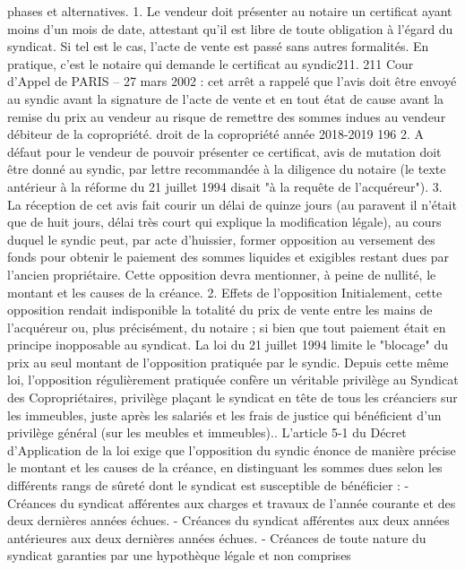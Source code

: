 	phases et alternatives.
	1. Le vendeur doit présenter au notaire un certificat ayant moins d'un mois de date, attestant
	qu'il est libre de toute obligation à l'égard du syndicat. Si tel est le cas, l'acte de vente est
	passé sans autres formalités. En pratique, c'est le notaire qui demande le certificat au
	syndic211.
	211 Cour d’Appel de PARIS – 27 mars 2002 : cet arrêt a rappelé que l’avis doit être envoyé au syndic avant la signature
	de l’acte de vente et en tout état de cause avant la remise du prix au vendeur au risque de remettre des sommes indues
	au vendeur débiteur de la copropriété.
	droit de la copropriété année 2018-2019
	196
	2. A défaut pour le vendeur de pouvoir présenter ce certificat, avis de mutation doit être
	donné au syndic, par lettre recommandée à la diligence du notaire (le texte antérieur à la
	réforme du 21 juillet 1994 disait "à la requête de l'acquéreur").
	3. La réception de cet avis fait courir un délai de quinze jours (au paravent il n'était que de
	huit jours, délai très court qui explique la modification légale), au cours duquel le syndic
	peut, par acte d'huissier, former opposition au versement des fonds pour obtenir le
	paiement des sommes liquides et exigibles restant dues par l'ancien propriétaire. Cette
	opposition devra mentionner, à peine de nullité, le montant et les causes de la créance.
	2. Effets de l’opposition
	Initialement, cette opposition rendait indisponible la totalité du prix de vente entre les mains de
	l'acquéreur ou, plus précisément, du notaire ; si bien que tout paiement était en principe inopposable au
	syndicat. La loi du 21 juillet 1994 limite le "blocage" du prix au seul montant de l'opposition pratiquée par
	le syndic.
	Depuis cette même loi, l'opposition régulièrement pratiquée confère un véritable privilège au Syndicat des
	Copropriétaires, privilège plaçant le syndicat en tête de tous les créanciers sur les immeubles, juste après
	les salariés et les frais de justice qui bénéficient d'un privilège général (sur les meubles et immeubles)..
	L'article 5-1 du Décret d'Application de la loi exige que l'opposition du syndic énonce de manière précise
	le montant et les causes de la créance, en distinguant les sommes dues selon les différents rangs de sûreté
	dont le syndicat est susceptible de bénéficier :
	- Créances du syndicat afférentes aux charges et travaux de l'année courante et des deux
	dernières années échues.
	- Créances du syndicat afférentes aux deux années antérieures aux deux dernières années
	échues.
	- Créances de toute nature du syndicat garanties par une hypothèque légale et non comprises
